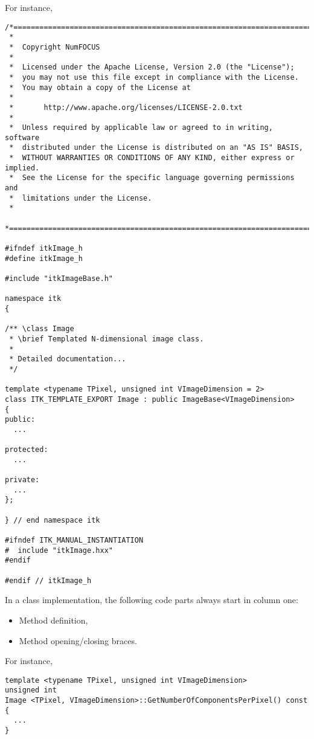 For instance,

\small
\begin{verbatim}
/*=========================================================================
 *
 *  Copyright NumFOCUS
 *
 *  Licensed under the Apache License, Version 2.0 (the "License");
 *  you may not use this file except in compliance with the License.
 *  You may obtain a copy of the License at
 *
 *       http://www.apache.org/licenses/LICENSE-2.0.txt
 *
 *  Unless required by applicable law or agreed to in writing, software
 *  distributed under the License is distributed on an "AS IS" BASIS,
 *  WITHOUT WARRANTIES OR CONDITIONS OF ANY KIND, either express or implied.
 *  See the License for the specific language governing permissions and
 *  limitations under the License.
 *
 *=========================================================================*/

#ifndef itkImage_h
#define itkImage_h

#include "itkImageBase.h"

namespace itk
{

/** \class Image
 * \brief Templated N-dimensional image class.
 *
 * Detailed documentation...
 */

template <typename TPixel, unsigned int VImageDimension = 2>
class ITK_TEMPLATE_EXPORT Image : public ImageBase<VImageDimension>
{
public:
  ...

protected:
  ...

private:
  ...
};

} // end namespace itk

#ifndef ITK_MANUAL_INSTANTIATION
#  include "itkImage.hxx"
#endif

#endif // itkImage_h
\end{verbatim}
\normalsize

In a class implementation, the following code parts always start in column one:
\begin{itemize}
\item Method definition,
\item Method opening/closing braces.
\end{itemize}

For instance,

\small
\begin{verbatim}
template <typename TPixel, unsigned int VImageDimension>
unsigned int
Image <TPixel, VImageDimension>::GetNumberOfComponentsPerPixel() const
{
  ...
}
\end{verbatim}
\normalsize

